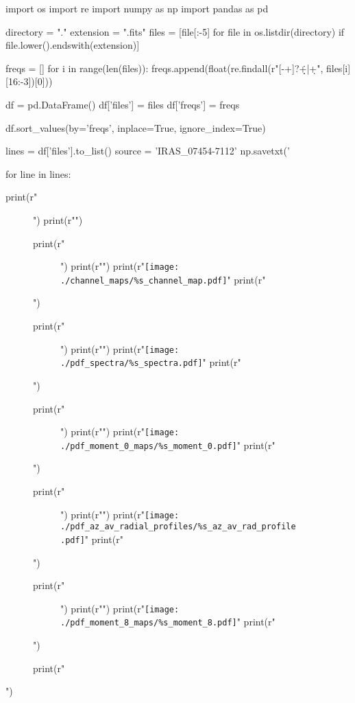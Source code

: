 \documentclass{article}
\begin{document}
\begin{pycode}

import os
import re
import numpy as np
import pandas as pd

directory = "."
extension = ".fits"
files = [file[:-5] for file in os.listdir(directory) if
file.lower().endswith(extension)]

freqs = []
for i in range(len(files)):
    freqs.append(float(re.findall(r"[-+]?\d*\.\d+|\d+", files[i][16:-3])[0]))

df = pd.DataFrame()
df['files'] = files
df['freqs'] = freqs

df.sort_values(by='freqs', inplace=True, ignore_index=True)

lines = df['files'].to_list()
source = 'IRAS_07454-7112'
np.savetxt('%

for line in lines:
   
   print(r"\begin{figure}[!ht]")
   print(r"\centering")

   print(r"\begin{subfigure}[b]{0.4\textwidth}")
   print(r"\centering")
   print(r"\texttt{[image: ./channel\_maps/\%s\_channel\_map.pdf]}" %
   print(r"\end{subfigure}")

   print(r"\begin{subfigure}[b]{0.4\textwidth}")
   print(r"\centering")
   print(r"\texttt{[image: ./pdf\_spectra/\%s\_spectra.pdf]}" %
   print(r"\end{subfigure}")

   print(r"\begin{subfigure}[b]{0.25\textwidth}")
   print(r"\centering")
   print(r"\texttt{[image: ./pdf\_moment\_0\_maps/\%s\_moment\_0.pdf]}" %
   print(r"\end{subfigure}")

   print(r"\begin{subfigure}[b]{0.25\textwidth}")
   print(r"\centering")
   print(r"\texttt{[image: ./pdf\_az\_av\_radial\_profiles/\%s\_az\_av\_rad\_profile.pdf]}" %
   print(r"\end{subfigure}")

   print(r"\begin{subfigure}[b]{0.25\textwidth}")
   print(r"\centering")
   print(r"\texttt{[image: ./pdf\_moment\_8\_maps/\%s\_moment\_8.pdf]}" %
   print(r"\end{subfigure}")

   print(r"\end{figure}")
\end{pycode}
\end{document}

